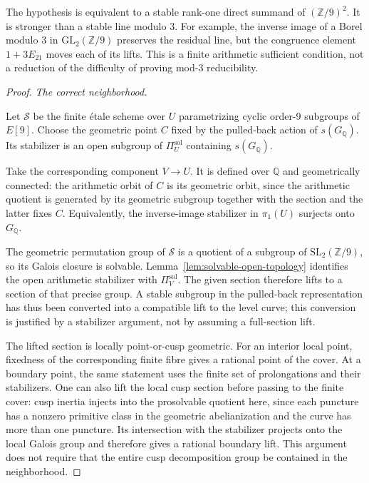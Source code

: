 The hypothesis is equivalent to a stable rank-one direct summand of
\((\mathbb Z/9)^2\). It is stronger than a stable line modulo 3. For
example, the inverse image of a Borel modulo 3 in
\(\mathrm{GL}_2(\mathbb Z/9)\) preserves the residual line, but the
congruence element \(1+3E_{21}\) moves each of its lifts. This is a
finite arithmetic sufficient condition, not a reduction of the
difficulty of proving mod-3 reducibility.

\begin{proof}\par\medskip\noindent\textit{The correct neighborhood.}\quad 

Let \(\mathcal S\) be the finite étale scheme over \(U\) parametrizing
cyclic order-9 subgroups of \(E[9]\). Choose the geometric point \(C\)
fixed by the pulled-back action of \(s(G_{\mathbb Q})\). Its stabilizer
is an open subgroup of \(\Pi_U^{\mathrm{sol}}\) containing
\(s(G_{\mathbb Q})\).

Take the corresponding component \(V\to U\). It is defined over
\(\mathbb Q\) and geometrically connected: the arithmetic orbit of \(C\)
is its geometric orbit, since the arithmetic quotient is generated by
its geometric subgroup together with the section and the latter fixes
\(C\). Equivalently, the inverse-image stabilizer in \(\pi_1(U)\)
surjects onto \(G_{\mathbb Q}\).

The geometric permutation group of \(\mathcal S\) is a quotient of a
subgroup of \(\mathrm{SL}_2(\mathbb Z/9)\), so its Galois closure is
solvable. Lemma~\ref{lem:solvable-open-topology} identifies the open arithmetic stabilizer with
\(\Pi_V^{\mathrm{sol}}\). The given section therefore lifts to a section
of that precise group. A stable subgroup in the pulled-back
representation has thus been converted into a compatible lift to the
level curve; this conversion is justified by a stabilizer argument, not
by assuming a full-section lift.

The lifted section is locally point-or-cusp geometric. For an interior
local point, fixedness of the corresponding finite fibre gives a
rational point of the cover. At a boundary point, the same statement
uses the finite set of prolongations and their stabilizers. One can also
lift the local cusp section before passing to the finite cover: cusp
inertia injects into the prosolvable quotient here, since each puncture
has a nonzero primitive class in the geometric abelianization and the
curve has more than one puncture. Its intersection with the stabilizer
projects onto the local Galois group and therefore gives a rational
boundary lift. This argument does not require that the entire cusp
decomposition group be contained in the neighborhood.


\end{proof}
